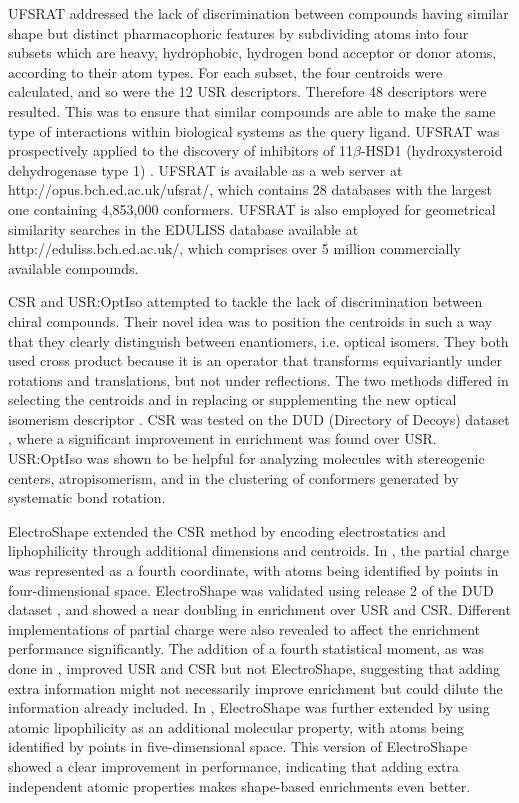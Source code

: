 \documentclass[a4,center,fleqn]{NAR}
\begin{document}
UFSRAT \cite{1436} addressed the lack of discrimination between compounds having similar shape but distinct pharmacophoric features by subdividing atoms into four subsets which are heavy, hydrophobic, hydrogen bond acceptor or donor atoms, according to their atom types. For each subset, the four centroids were calculated, and so were the 12 USR descriptors. Therefore 48 descriptors were resulted. This was to ensure that similar compounds are able to make the same type of interactions within biological systems as the query ligand. UFSRAT was prospectively applied to the discovery of inhibitors of 11$\beta$-HSD1 (hydroxysteroid dehydrogenase type 1) \cite{1505}. UFSRAT is available as a web server at http://opus.bch.ed.ac.uk/ufsrat/, which contains 28 databases with the largest one containing 4,853,000 conformers. UFSRAT is also employed for geometrical similarity searches in the EDULISS database \cite{1437} available at http://eduliss.bch.ed.ac.uk/, which comprises over 5 million commercially available compounds.

CSR \cite{1334} and USR:OptIso \cite{1335} attempted to tackle the lack of discrimination between chiral compounds. Their novel idea was to position the centroids in such a way that they clearly distinguish between enantiomers, i.e. optical isomers. They both used cross product because it is an operator that transforms equivariantly under rotations and translations, but not under reflections. The two methods differed in selecting the centroids and in replacing or supplementing the new optical isomerism descriptor \cite{1335}. CSR \cite{1334} was tested on the DUD (Directory of Decoys) dataset \cite{87}, where a significant improvement in enrichment was found over USR. USR:OptIso \cite{1335} was shown to be helpful for analyzing molecules with stereogenic centers, atropisomerism, and in the clustering of conformers generated by systematic bond rotation.

ElectroShape \cite{1337,1338} extended the CSR \cite{1334} method by encoding electrostatics and liphophilicity through additional dimensions and centroids. In \cite{1337}, the partial charge was represented as a fourth coordinate, with atoms being identified by points in four-dimensional space. ElectroShape was validated using release 2 of the DUD dataset \cite{87}, and showed a near doubling in enrichment over USR and CSR. Different implementations of partial charge were also revealed to affect the enrichment performance significantly. The addition of a fourth statistical moment, as was done in \cite{1333}, improved USR and CSR but not ElectroShape, suggesting that adding extra information might not necessarily improve enrichment but could dilute the information already included. In \cite{1338}, ElectroShape was further extended by using atomic lipophilicity as an additional molecular property, with atoms being identified by points in five-dimensional space. This version of ElectroShape showed a clear improvement in performance, indicating that adding extra independent atomic properties makes shape-based enrichments even better.
\end{document}
